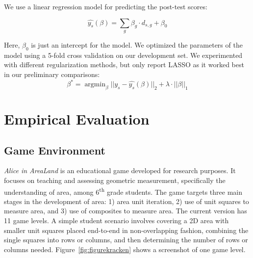 \documentclass{sigchi}
\DeclareMathOperator*{\argmin}{argmin}
\begin{document}
We use  a linear regression model for predicting the post-test scores:

\begin{equation}
\hat {y_s}(\beta) =   \sum_g \beta_g \cdot d_{s,g}  + \beta_0
\end{equation}

Here, $\beta_0$ is just an intercept for the  model.  
We optimized the parameters of the model using a 5-fold cross validation on our development set.
We experimented with different regularization methods, but only report LASSO \cite{tibshirani1996regression} as it worked best in our preliminary comparisons:
\begin{equation}
\beta^* = \argmin_\beta || y_s - \hat{y_s}(\beta)  ||_2 + \lambda \cdot || \beta ||_1
\end{equation}


\section{Empirical Evaluation}

\subsection{Game Environment}
\textit {Alice in AreaLand} is an educational game developed for research purposes. It focuses on teaching and assessing geometric measurement, specifically the understanding of area, among 6\textsuperscript{th} grade students. The game targets three main stages in the development of area: 1) area unit iteration, 2) use of unit squares to measure area, and 3) use of composites to measure area. The current version has 11 game levels. A simple student scenario involves covering a 2D area with smaller unit squares placed end-to-end in non-overlapping fashion, combining the single squares into rows or columns, and then determining the number of rows or columns needed. Figure~\ref{fig:figurekracken} shows a screenshot of one game level.
\end{document}
